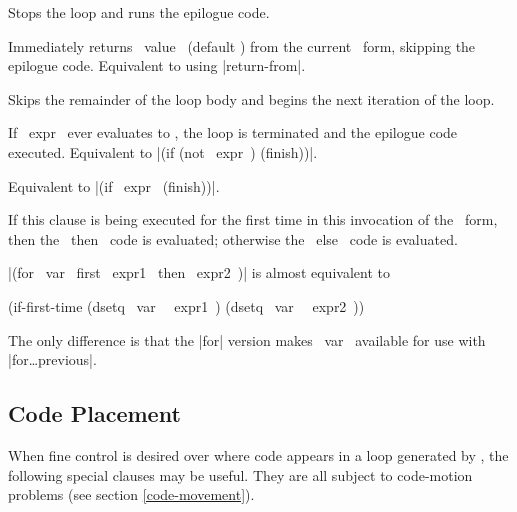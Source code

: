 \begin{clauses}

Stops the loop and runs the epilogue code.

%
%

Immediately returns ~value~ (default \nil) from the current \iter\
form, skipping the epilogue code.  Equivalent to using |return-from|.

Skips the remainder of the loop body and begins the next iteration of
the loop.

If ~expr~ ever evaluates to \nil, the loop is terminated and the
epilogue code executed.  Equivalent to |(if (not ~expr~) (finish))|.

Equivalent to |(if ~expr~ (finish))|.

If this clause is being executed for the first time in this invocation
of the \iter\ form, then the ~then~ code is evaluated; otherwise the
~else~ code is evaluated.

\cpar |(for ~var~ first ~expr1~ then ~expr2~)| is almost equivalent to
\begin{program}
(if-first-time (dsetq ~var~ ~expr1~)
               (dsetq ~var~ ~expr2~))
\end{program}
The only difference is that the |for| version makes ~var~ available
for use with |for\dots previous|.

\end{clauses}

\subsection{Code Placement}
When fine control is desired over where code appears in a loop
generated by \iter, the following special clauses may be useful.
They are all subject to code-motion problems (see section
\ref{code-movement}).

